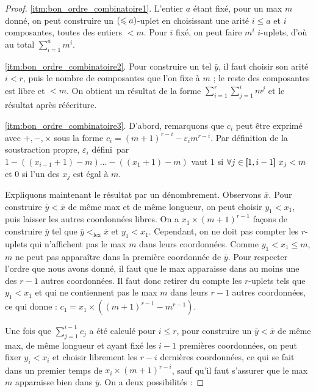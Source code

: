 		\begin{proof}
			\ref{itm:bon_ordre_combinatoire1}. L'entier $a$ étant fixé, pour un max $m$ donné, on peut construire un $\left( \leqslant a \right)$-uplet en choisissant une arité $i \leqslant a$ et $i$ composantes, toutes des entiers $< m$. Pour $i$ fixé, on peut faire $m^{i}$ $i$-uplets, d'où au total $\sum_{i=1}^{a} m^i$.
			
			\ref{itm:bon_ordre_combinatoire2}. Pour construire un tel $\bar{y}$, il faut choisir son arité $i<r$, puis le nombre de composantes que l'on fixe à $m$ ; le reste des composantes est libre et $<m$. On obtient un résultat de la forme $\sum_{i=1}^{r} \sum_{j= 1}^{i} m^j$ et le résultat après réécriture.
			
			\ref{itm:bon_ordre_combinatoire3}. D'abord, remarquons que $c_i$ peut être exprimé avec $+,-,\times$ sous la forme $c_i = \left( m+1 \right)^{r-i} - \varepsilon_i m^{r-i}$. Par définition de la soustraction propre, $\varepsilon_i$ défini\footnotemark\ par $1 - \left(\left(x_{i-1} +1 \right)-m\right) \dots  - \left(\left(x_1 +1 \right)-m\right)$ vaut $1$ si $ \forall j \in \left[\,\!\!\!\left[ 1 , i-1 \right]\,\!\!\!\right] \: x_j < m$ et $0$ si l'un des $x_j$ est égal à $m$.
			
			
			Expliquons maintenant le résultat par un dénombrement. Observons $\overline{x}$. Pour construire $\bar{y} < \overline{x}$ de même max et de même longueur, on peut choisir $y_1<x_1$, puis laisser les autres coordonnées libres. On a $x_1 \times \left(m+1\right)^{r-1}$ façons de construire $\bar{y}$ tel que $\bar{y} <_{\text{lex}} \overline{x}$ et $y_1<x_1$. Cependant, on ne doit pas compter les $r$-uplets qui n'affichent pas le max $m$ dans leurs coordonnées. Comme $y_1 < x_1 \leqslant m$, $m$ ne peut pas apparaître dans la première coordonnée de $\bar{y}$. Pour respecter l'ordre que nous avons donné, il faut que le max apparaisse dans au moins une des $r-1$ autres coordonnées. Il faut donc retirer du compte les $r$-uplets tels que $y_1<x_1$ et qui ne contiennent pas le max $m$ dans leurs $r-1$ autres coordonnées, ce qui donne : $c_1 = x_1 \times \left(\left(m+1\right)^{r-1} - m^{r-1}\right)$.

			
			Une fois que $\sum_{j=1}^{i-1} c_j$ a été calculé pour $i \leqslant r$, pour construire un $\bar{y} < \overline{x}$ de même max, de même longueur et ayant fixé les $i-1$ premières coordonnées, on peut fixer $y_i<x_i$ et choisir librement les $r-i$ dernières coordonnées, ce qui se fait dans un premier temps de $x_i \times \left(m+1\right)^{r-i}$, sauf qu'il faut s'assurer que le max $m$ apparaisse bien dans $\bar{y}$. On a deux possibilités :
			

\end{proof}

